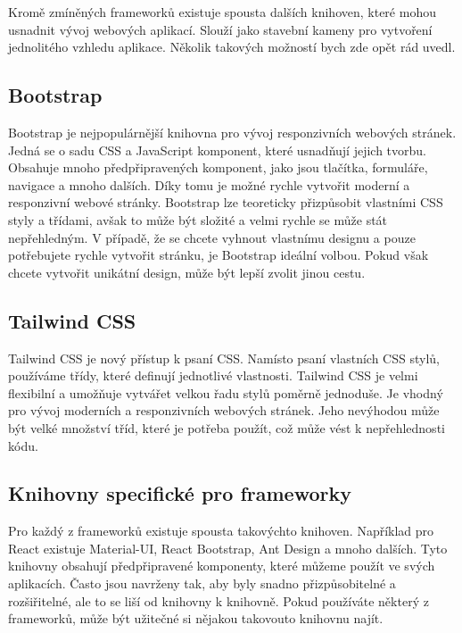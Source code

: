 Kromě zmíněných frameworků existuje spousta dalších knihoven, které mohou usnadnit vývoj webových aplikací. Slouží jako stavební kameny pro vytvoření jednolitého vzhledu aplikace. Několik takových možností bych zde opět rád uvedl.

\subsection*{Bootstrap}
\label{subsec:bootstrap}

Bootstrap je nejpopulárnější knihovna pro vývoj responzivních webových stránek. Jedná se o sadu CSS a JavaScript komponent, které usnadňují jejich tvorbu. Obsahuje mnoho předpřipravených komponent, jako jsou tlačítka, formuláře, navigace a mnoho dalších. Díky tomu je možné rychle vytvořit moderní a responzivní webové stránky. Bootstrap lze teoreticky přizpůsobit vlastními CSS styly a třídami, avšak to může být složité a velmi rychle se může stát nepřehledným. V případě, že se chcete vyhnout vlastnímu designu a pouze potřebujete rychle vytvořit stránku, je Bootstrap ideální volbou. Pokud však chcete vytvořit unikátní design, může být lepší zvolit jinou cestu.

\subsection*{Tailwind CSS}
\label{subsec:tailwind-css}

Tailwind CSS je nový přístup k psaní CSS. Namísto psaní vlastních CSS stylů, používáme třídy, které definují jednotlivé vlastnosti. Tailwind CSS je velmi flexibilní a umožňuje vytvářet velkou řadu stylů poměrně jednoduše. Je vhodný pro vývoj moderních a responzivních webových stránek. Jeho nevýhodou může být velké množství tříd, které je potřeba použít, což může vést k nepřehlednosti kódu.

\subsection*{Knihovny specifické pro frameworky}
\label{subsec:framework-specific-libraries}

Pro každý z frameworků existuje spousta takovýchto knihoven. Například pro React existuje Material-UI, React Bootstrap, Ant Design a mnoho dalších. Tyto knihovny obsahují předpřipravené komponenty, které můžeme použít ve svých aplikacích. Často jsou navrženy tak, aby byly snadno přizpůsobitelné a rozšiřitelné, ale to se liší od knihovny k knihovně. Pokud používáte některý z frameworků, může být užitečné si nějakou takovouto knihovnu najít.

